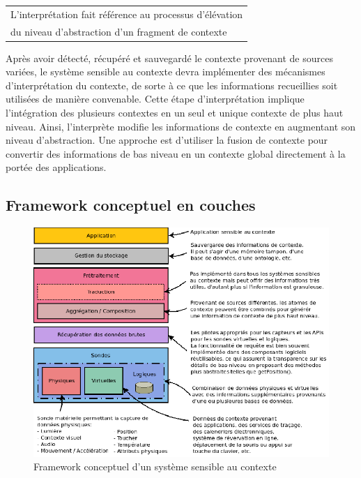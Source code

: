 {%
    \centering
    \begin{tabular}{l}
        L'interprétation fait référence au processus d'élévation \\
        du niveau d'abstraction d'un fragment de contexte
        \cite{dey_conceptual_2001} \\
    \end{tabular}
\par}%

Après avoir détecté, récupéré et sauvegardé le contexte provenant de sources
variées, le système sensible au contexte devra implémenter des mécanismes
d'interprétation du contexte, de sorte à ce que les informations recueillies
soit utilisées de manière convenable. Cette étape d'interprétation implique
l'intégration des plusieurs contextes en un seul et unique contexte de plus haut
niveau. Ainsi, l'interprète modifie les informations de contexte en augmentant
son niveau d'abstraction. Une approche est d'utiliser la fusion de contexte
pour convertir des informations de bas niveau en un contexte global directement
à la portée des applications.

\subsection{Framework conceptuel en couches}

\begin{figure}[H]
    \centering
    \includegraphics[width=.7\textwidth]{img/layered_conceptual_framework}
    \caption{Framework conceptuel d'un système sensible au contexte}
    \label{archi}
\end{figure}

